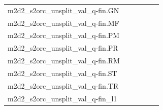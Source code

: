 \documentclass[dvipsnames]{article}
\begin{document}
\begin{appendix}
{\begin{longtable}{m{6cm}m{1.7cm}m{1.7cm}m{1.7cm}m{1.7cm}m{1.7cm}}
	m2d2\_s2orc\_unsplit\_val\_q-fin.GN  & \colorbox[HTML]{bfe596}{\makebox[\mywidth][c]{13.79}} & \colorbox[HTML]{ddf1a6}{\makebox[\mywidth][c]{13.91}} & \colorbox[HTML]{ffffe5}{\makebox[\mywidth][c]{15.73}} & \colorbox[HTML]{cdeb9d}{\makebox[\mywidth][c]{13.83}} & \colorbox[HTML]{77c578}{\makebox[\mywidth][c]{13.61}}\\
	m2d2\_s2orc\_unsplit\_val\_q-fin.MF  & \colorbox[HTML]{7dc87b}{\makebox[\mywidth][c]{9.91}} & \colorbox[HTML]{e1f3a9}{\makebox[\mywidth][c]{10.21}} & \colorbox[HTML]{ffffe5}{\makebox[\mywidth][c]{11.92}} & \colorbox[HTML]{b7e193}{\makebox[\mywidth][c]{10.04}} & \colorbox[HTML]{77c578}{\makebox[\mywidth][c]{9.90}}\\
	m2d2\_s2orc\_unsplit\_val\_q-fin.PM  & \colorbox[HTML]{91d183}{\makebox[\mywidth][c]{11.00}} & \colorbox[HTML]{e5f4ab}{\makebox[\mywidth][c]{11.31}} & \colorbox[HTML]{ffffe5}{\makebox[\mywidth][c]{13.14}} & \colorbox[HTML]{c2e698}{\makebox[\mywidth][c]{11.14}} & \colorbox[HTML]{77c578}{\makebox[\mywidth][c]{10.94}}\\
	m2d2\_s2orc\_unsplit\_val\_q-fin.PR  & \colorbox[HTML]{ffffe5}{\makebox[\mywidth][c]{15.87}} & \colorbox[HTML]{98d485}{\makebox[\mywidth][c]{9.25}} & \colorbox[HTML]{ecf7b1}{\makebox[\mywidth][c]{10.37}} & \colorbox[HTML]{90d082}{\makebox[\mywidth][c]{9.20}} & \colorbox[HTML]{77c578}{\makebox[\mywidth][c]{9.03}}\\
	m2d2\_s2orc\_unsplit\_val\_q-fin.RM  & \colorbox[HTML]{b6e092}{\makebox[\mywidth][c]{11.35}} & \colorbox[HTML]{def2a6}{\makebox[\mywidth][c]{11.49}} & \colorbox[HTML]{ffffe5}{\makebox[\mywidth][c]{13.08}} & \colorbox[HTML]{cae99c}{\makebox[\mywidth][c]{11.41}} & \colorbox[HTML]{77c578}{\makebox[\mywidth][c]{11.22}}\\
	m2d2\_s2orc\_unsplit\_val\_q-fin.ST  & \colorbox[HTML]{c3e698}{\makebox[\mywidth][c]{12.43}} & \colorbox[HTML]{cae99c}{\makebox[\mywidth][c]{12.46}} & \colorbox[HTML]{ffffe5}{\makebox[\mywidth][c]{14.18}} & \colorbox[HTML]{c2e698}{\makebox[\mywidth][c]{12.43}} & \colorbox[HTML]{77c578}{\makebox[\mywidth][c]{12.26}}\\
	m2d2\_s2orc\_unsplit\_val\_q-fin.TR  & \colorbox[HTML]{8ccf81}{\makebox[\mywidth][c]{12.79}} & \colorbox[HTML]{e2f3a9}{\makebox[\mywidth][c]{13.14}} & \colorbox[HTML]{ffffe5}{\makebox[\mywidth][c]{15.32}} & \colorbox[HTML]{afdd8f}{\makebox[\mywidth][c]{12.89}} & \colorbox[HTML]{77c578}{\makebox[\mywidth][c]{12.74}}\\
	m2d2\_s2orc\_unsplit\_val\_q-fin\_l1  & \colorbox[HTML]{bfe596}{\makebox[\mywidth][c]{13.79}} & \colorbox[HTML]{ddf1a6}{\makebox[\mywidth][c]{13.91}} & \colorbox[HTML]{ffffe5}{\makebox[\mywidth][c]{15.73}} & \colorbox[HTML]{cdeb9d}{\makebox[\mywidth][c]{13.83}} & \colorbox[HTML]{77c578}{\makebox[\mywidth][c]{13.61}}\\

\end{longtable}}
\end{appendix}
\end{document}
